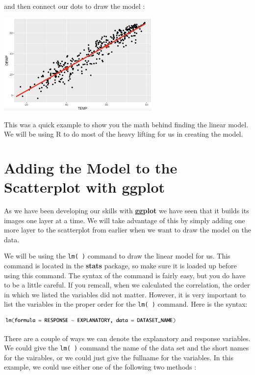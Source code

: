 \documentclass[
  letterpaper,
  DIV=11,
  numbers=noendperiod]{scrreprt}
\begin{document}
and then connect our dots to draw the model :

\includegraphics[width=0.6\textwidth,height=\textheight]{./images/LMR_7.jpg}

This was a quick example to show you the math behind finding the linear
model. We will be using R to do most of the heavy lifting for us in
creating the model.

\section*{Adding the Model to the Scatterplot with
ggplot}\label{adding-the-model-to-the-scatterplot-with-ggplot}


As we have been developing our skills with \textbf{ggplot} we have seen
that it builds its images one layer at a time. We will take advantage of
this by simply adding one more layer to the scatterplot from earlier
when we want to draw the model on the data.

We will be using the \texttt{lm(\ )} command to draw the linear model
for us. This command is located in the \textbf{stats} package, so make
sure it is loaded up before using this command. The syntax of the
command is fairly easy, but you do have to be a little careful. If you
remcall, when we calculated the correlation, the order in which we
listed the variables did not matter. However, it is very important to
list the variables in the proper order for the \texttt{lm(\ )} command.
Here is the syntax:

\includegraphics[width=0.7\textwidth,height=\textheight]{./images/LMR_8.jpg}

There are a couple of ways we can denote the explanatory and response
variables. We could give the \texttt{lm(\ )} command the name of the
data set and the short names for the vairables, or we could just give
the fullname for the variables. In this example, we could use either one
of the following two methods :
\end{document}

